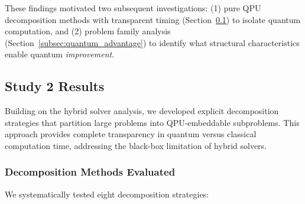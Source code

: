 These findings motivated two subsequent investigations: (1) pure QPU decomposition methods with transparent timing (Section~\ref{subsec:qpu_decomposition}) to isolate quantum computation, and (2) problem family analysis (Section~\ref{subsec:quantum_advantage}) to identify what structural characteristics enable quantum \textit{improvement}.


\subsection{Study 2 Results}
\label{subsec:qpu_decomposition}

Building on the hybrid solver analysis, we developed explicit decomposition strategies that partition large problems into QPU-embeddable subproblems. This approach provides complete transparency in quantum versus classical computation time, addressing the black-box limitation of hybrid solvers.

\subsubsection{Decomposition Methods Evaluated}

We systematically tested eight decomposition strategies:

